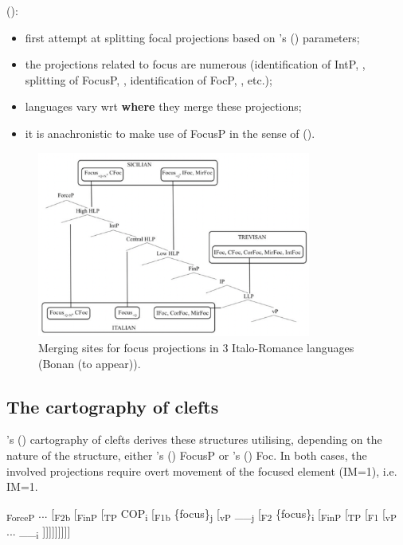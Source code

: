 \documentclass[fleqn,10pt]{wlscirep}
\begin{document}
\noindent \citealt{bonan22} (\citeyear{bonan22}): 
\begin{itemize}
\item[\ding{227}] first attempt at splitting focal projections based on \citeauthor{rizzi2017}'s (\citeyear{rizzi2017}) parameters;   
\item[\ding{227}] the projections related to focus are numerous (identification of IntP, \citealt{rizzi2001position}, splitting of FocusP, \citealt{rizzi2018}, identification of FocP, \citealt{belletti2004}, etc.);
\item[\ding{227}] languages vary wrt \textbf{where} they merge these projections;
\item[\ding{227}] it is anachronistic to make use of FocusP in the sense of \citeauthor{rizzi1997fine} (\citeyear{rizzi1997fine}).
\end{itemize}

\begin{figure}[h!]
    \centering
    \includegraphics[width=90mm]{images/focus.png}
    \caption{Merging sites for focus projections in 3 Italo-Romance languages (Bonan (to appear)).}
    \label{fig:focus}
  \end{figure}

\subsection*{The cartography of clefts}

\citeauthor{belletti2015}’s (\citeyear{belletti2015}) cartography of clefts derives these structures utilising, depending on the nature of the structure, either \citeauthor{rizzi1997fine}’s (\citeyear{rizzi1997fine}) FocusP or \citeauthor{belletti2004}’s (\citeyear{belletti2004}) Foc. 
In both cases, the involved projections require overt movement of the focused element (IM=1), i.e. IM=1.

\begin{exe}
    \ex {[}\textsubscript{ForceP} ... {[}\textsubscript{F2b} {[}\textsubscript{FinP} {[}\textsubscript{TP} COP\textsubscript{i} {[}\textsubscript{F1b} \{focus\}\textsubscript{j} {[}\textsubscript{vP} \_\_\textsubscript{j} {[}\textsubscript{F2} \{focus\}\textsubscript{i} {[}\textsubscript{FinP} {[}\textsubscript{TP} {[}\textsubscript{F1} {[}\textsubscript{vP} ... \_\_\textsubscript{i} {]]]]]]]]]}
\end{exe}
\end{document}
